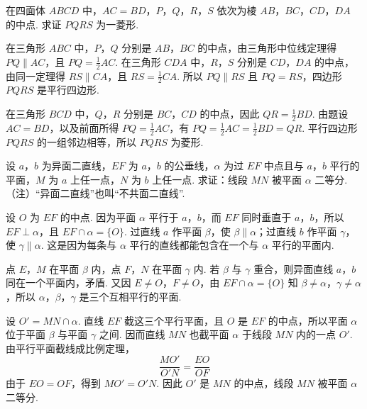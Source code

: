 \documentclass[UTF8,a4paper,oneside,11pt]{ctexbook}
\begin{document}
\begin{problem}
在四面体 \(ABCD\) 中，\(AC=BD\)，\(P\)，\(Q\)，\(R\)，\(S\) 依次为棱 \(AB\)，\(BC\)，\(CD\)，\(DA\) 的中点. 求证 \(PQRS\) 为一菱形.
\end{problem}

\begin{solution}
在三角形 \(ABC\) 中，\(P\)，\(Q\) 分别是 \(AB\)，\(BC\) 的中点，由三角形中位线定理得 \(PQ\parallel AC\)，且 \(PQ=\frac{1}{2}AC\).
在三角形 \(CDA\) 中，\(R\)，\(S\) 分别是 \(CD\)，\(DA\) 的中点，由同一定理得 \(RS\parallel CA\)，且 \(RS=\frac{1}{2}CA\).
所以 \(PQ\parallel RS\) 且 \(PQ=RS\)，四边形 \(PQRS\) 是平行四边形.

在三角形 \(BCD\) 中，\(Q\)，\(R\) 分别是 \(BC\)，\(CD\) 的中点，因此 \(QR=\frac{1}{2}BD\). 由题设 \(AC=BD\)，以及前面所得 \(PQ=\frac{1}{2}AC\)，有 \(PQ=\frac{1}{2}AC=\frac{1}{2}BD=QR\).
平行四边形 \(PQRS\) 的一组邻边相等，所以 \(PQRS\) 为菱形.

\end{solution}

\begin{problem}
设 \(a\)，\(b\) 为异面二直线，\(EF\) 为 \(a\)，\(b\) 的公垂线，\(\alpha\) 为过 \(EF\) 中点且与 \(a\)，\(b\) 平行的平面，\(M\) 为 \(a\) 上任一点，\(N\) 为 \(b\) 上任一点. 求证：线段 \(MN\) 被平面 \(\alpha\) 二等分. （注）“异面二直线”也叫“不共面二直线”.
\end{problem}

\begin{solution}
设 \(O\) 为 \(EF\) 的中点. 因为平面 \(\alpha\) 平行于 \(a\)，\(b\)，而 \(EF\) 同时垂直于 \(a\)，\(b\)，所以 \(EF\perp\alpha\)，且 \(EF\cap\alpha=\{O\}\). 过直线 \(a\) 作平面 \(\beta\)，使 \(\beta\parallel\alpha\)；过直线 \(b\) 作平面 \(\gamma\)，使 \(\gamma\parallel\alpha\). 这是因为每条与 \(\alpha\) 平行的直线都能包含在一个与 \(\alpha\) 平行的平面内.

点 \(E\)，\(M\) 在平面 \(\beta\) 内，点 \(F\)，\(N\) 在平面 \(\gamma\) 内. 若 \(\beta\) 与 \(\gamma\) 重合，则异面直线 \(a\)，\(b\) 同在一个平面内，矛盾. 又因 \(E\ne O\)，\(F\ne O\)，由 \(EF\cap\alpha=\{O\}\) 知 \(\beta\ne\alpha\)，\(\gamma\ne\alpha\)，所以 \(\alpha\)，\(\beta\)，\(\gamma\) 是三个互相平行的平面.

设 \(O'=MN\cap\alpha\). 直线 \(EF\) 截这三个平行平面，且 \(O\) 是 \(EF\) 的中点，所以平面 \(\alpha\) 位于平面 \(\beta\) 与平面 \(\gamma\) 之间. 因而直线 \(MN\) 也截平面 \(\alpha\) 于线段 \(MN\) 内的一点 \(O'\). 由平行平面截线成比例定理，
\[
\frac{MO'}{O'N}=\frac{EO}{OF}
\]
由于 \(EO=OF\)，得到 \(MO'=O'N\). 因此 \(O'\) 是 \(MN\) 的中点，线段 \(MN\) 被平面 \(\alpha\) 二等分.

\end{solution}
\end{document}
